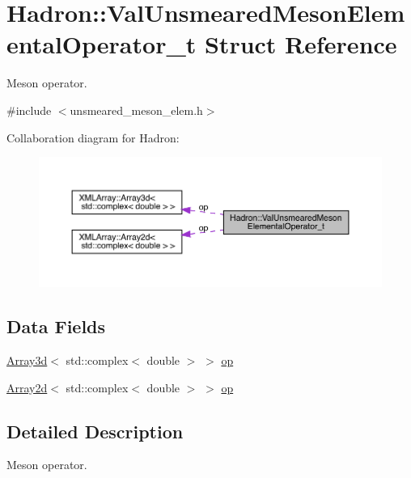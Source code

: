 \hypertarget{structHadron_1_1ValUnsmearedMesonElementalOperator__t}{}\section{Hadron\+:\+:Val\+Unsmeared\+Meson\+Elemental\+Operator\+\_\+t Struct Reference}
\label{structHadron_1_1ValUnsmearedMesonElementalOperator__t}


Meson operator.  




{\ttfamily \#include $<$unsmeared\+\_\+meson\+\_\+elem.\+h$>$}



Collaboration diagram for Hadron\+:
\nopagebreak
\begin{figure}[H]
\begin{center}
\leavevmode
\includegraphics[width=350pt]{d9/d84/structHadron_1_1ValUnsmearedMesonElementalOperator__t__coll__graph}
\end{center}
\end{figure}
\subsection*{Data Fields}
\begin{DoxyCompactItemize}
\item 
\mbox{\hyperlink{classXMLArray_1_1Array3d}{Array3d}}$<$ std\+::complex$<$ double $>$ $>$ \mbox{\hyperlink{structHadron_1_1ValUnsmearedMesonElementalOperator__t_adddbc042cae219cdbf72683bd441b129}{op}}
\item 
\mbox{\hyperlink{classXMLArray_1_1Array2d}{Array2d}}$<$ std\+::complex$<$ double $>$ $>$ \mbox{\hyperlink{structHadron_1_1ValUnsmearedMesonElementalOperator__t_a5715d6a6a39520f277256db9ad3bd034}{op}}
\end{DoxyCompactItemize}


\subsection{Detailed Description}
Meson operator. 


